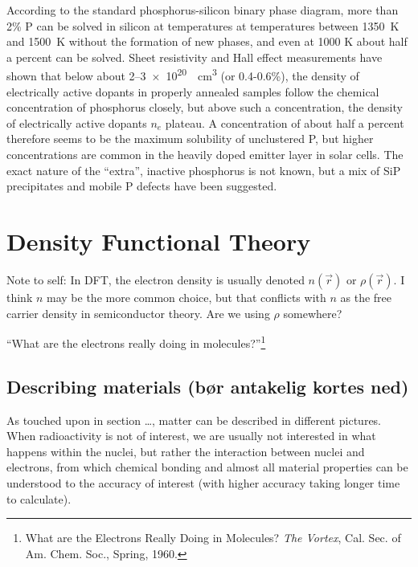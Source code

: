 \documentclass[11pt,bibliography=totoc,index=totoc]{scrbook}   %
\begin{document}
According to the standard phosphorus-silicon binary phase diagram, more than 2\% P can be solved in silicon at temperatures at temperatures between \SI{1350}{\kelvin} and \SI{1500}{\kelvin} without the formation of new phases, and even at 1000 K about half a percent can be solved.\cite{PSiPhaseDiagram} 
Sheet resistivity and Hall effect measurements have shown that below about 2–\SI{3e20}{\per\centi\metre\cubed} (or 0.4-0.6\%), the density of electrically active dopants in properly annealed samples follow the chemical concentration of phosphorus closely, but above such a concentration, the density of electrically active dopants $n_e$ plateau.\cite{Tannenbaum:1961}
A concentration of about half a percent therefore seems to be the maximum solubility of unclustered P,\cite{Solmi:1998} but higher concentrations
are common in the heavily doped emitter layer in solar cells.\cite{Bentzen:2006b}
The exact nature of the ``extra'', inactive phosphorus is not known, but a mix of SiP precipitates and mobile P defects have been suggested.\cite{Armigliato:1976}\cite{Solmi:1996} 

\chapter{Density Functional Theory}

Note to self: In DFT, the electron density is usually denoted $n(\vec{r})$ or
$\rho(\vec{r})$. I think $n$ may be the more common choice, but that conflicts
with $n$ as the free carrier density in semiconductor theory. Are we using
$\rho$ somewhere?

``What are the electrons really doing in molecules?''\footnote{What are the
Electrons Really Doing in Molecules? \textit{The Vortex}, Cal. Sec. of
Am. Chem. Soc., Spring, 1960.}

\section{Describing materials (bør antakelig kortes ned)}

As touched upon in section \ldots, matter can be described in different pictures. When radioactivity is not of interest, we are usually not interested in what happens within the nuclei, but rather the interaction between nuclei and electrons, from which chemical bonding and almost all material properties can be understood to the accuracy of interest (with higher accuracy taking longer time to calculate).
\end{document}
